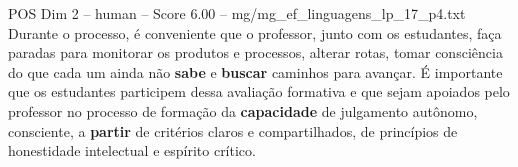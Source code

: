 \begin{textsample}{POS Dim 2 – human – Score 6.00 – mg/mg\_ef\_linguagens\_lp\_17\_p4.txt}  \label{ex:f2_pos_012}
Durante o processo, é conveniente que o professor, junto com os estudantes, faça paradas para monitorar os produtos e processos, alterar rotas, tomar consciência do que cada um ainda não \textbf{sabe} e \textbf{buscar} caminhos para avançar. É importante que os estudantes participem dessa avaliação formativa e que sejam apoiados pelo professor no processo de formação da \textbf{capacidade} de julgamento autônomo, consciente, a \textbf{partir} de critérios claros e compartilhados, de princípios de honestidade intelectual e espírito crítico.

\end{textsample}
